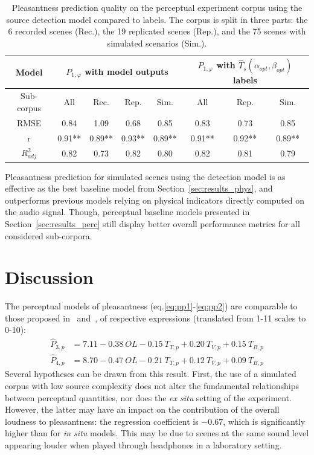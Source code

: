 \documentclass[11pt,a4paper]{article}
\begin{document}
\begin{table}[t]
\centering
\caption{Pleasantness prediction quality on the perceptual experiment corpus using the source detection model compared to labels. The corpus is split in three parts: the 6 recorded scenes (Rec.), the 19 replicated scenes (Rep.), and the 75 scenes with simulated scenarios (Sim.).}
\label{tab:pppred}
\begin{tabular}{ c | c c c c | c c c }
\hline
	Model & \multicolumn{4}{|c}{$P_{1, \varphi}$ with model outputs} & \multicolumn{3}{|c}{$P_{1, \varphi}$ with $\hat T_s(\alpha_{opt}, \beta_{opt})$ labels} \\ \hline
	Sub-corpus & All & Rec. & Rep. & Sim. & All & Rep. & Sim. \\ \hline
	RMSE & 0.84 & 1.09 & 0.68 & 0.85 & 0.83 & 0.73 & 0.85 \\ \hline
	r & 0.91** & 0.89** & 0.93** & 0.89** & 0.91** & 0.92** & 0.89** \\ \hline
	$R^2_{adj}$ & 0.82 & 0.73 & 0.82 & 0.80 & 0.82 & 0.81 & 0.79 \\ \hline
\end{tabular}
\end{table}

Pleasantness prediction for simulated scenes using the detection model is as effective as the best baseline model from Section~\ref{sec:results_phys}, and outperforms previous models relying on physical indicators directly computed on the audio signal. Though, perceptual baseline models presented in Section~\ref{sec:results_perc} still display better overall performance metrics for all considered sub-corpora.


\section{Discussion}
\label{sec:discussion}

The perceptual models of pleasantness (eq.\ref{eq:pp1}-\ref{eq:pp2}) are comparable to those proposed in~\cite{ricciardi2014} and~\cite{aumond2017}, of respective expressions (translated from 1-11 scales to 0-10):
\begin{align}
\hat P_{3, p} &= 7.11 - 0.38~OL - 0.15~T_{T, p} + 0.20~T_{V, p} + 0.15~T_{B, p}\\
\hat P_{4, p} &= 8.70 - 0.47~OL - 0.21~T_{T, p} + 0.12~T_{V, p} + 0.09~T_{B, p}
\end{align}
Several hypotheses can be drawn from this result. First, the use of a simulated corpus with low source complexity does not alter the fundamental relationships between perceptual quantities, nor does the \textit{ex situ} setting of the experiment. However, the latter may have an impact on the contribution of the overall loudness to pleasantness: the regression coefficient is $-0.67$, which is significantly higher than for \textit{in situ} models. This may be due to scenes at the same sound level appearing louder when played through headphones in a laboratory setting.
\end{document}
